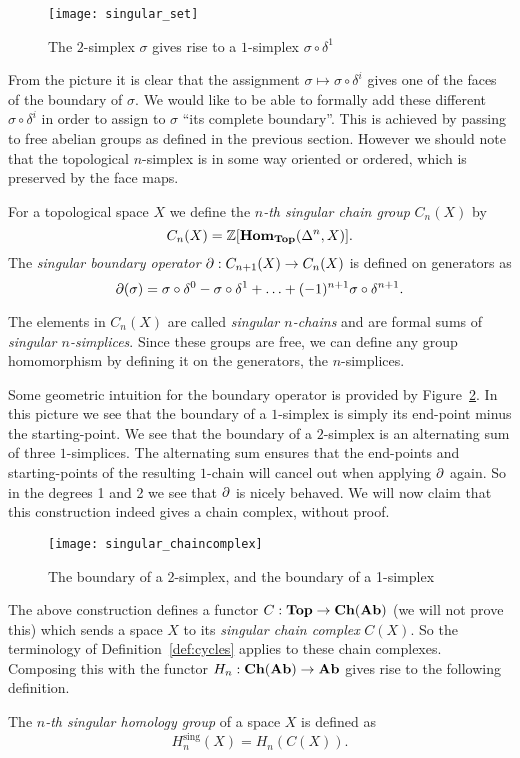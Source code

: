 \begin{figure}[h!]
	\texttt{[image: singular\_set]}
	\caption{The $2$-simplex $\sigma$ gives rise to a $1$-simplex $\sigma \circ \delta^1$}
	\label{fig:diagram_d}
\end{figure}

From the picture it is clear that the assignment $\sigma \mapsto \sigma \circ \delta^i$ gives one of the faces of the boundary of $\sigma$. We would like to be able to formally add these different $\sigma \circ \delta^i$ in order to assign to $\sigma$ ``its complete boundary''. This is achieved by passing to free abelian groups as defined in the previous section. However we should note that the topological $n$-simplex is in some way oriented or ordered, which is preserved by the face maps.

\begin{definition}
	For a topological space $X$ we define the \emph{$n$-th singular chain group} $C_n(X)$ by
	$$ C_n(X) = \mathbb{Z}[\mathbf{Hom}_{\mathbf{Top}}(\Delta^n, X)]. $$
	The \emph{singular boundary operator} $\partial : C_{n+1}(X) \to C_n(X)$ is defined on generators as
	$$ \partial(\sigma) = \sigma \circ \delta^0 - \sigma \circ \delta^1 + \ldots + (-1)^{n+1} \sigma \circ \delta^{n+1}.$$
\end{definition}

The elements in $C_n(X)$ are called \emph{singular $n$-chains} and are formal sums of \emph{singular $n$-simplices}. Since these groups are free, we can define any group homomorphism by defining it on the generators, the $n$-simplices.

Some geometric intuition for the boundary operator is provided by Figure~\ref{fig:singular_chaincomplex}. In this picture we see that the boundary of a $1$-simplex is simply its end-point minus the starting-point. We see that the boundary of a $2$-simplex is an alternating sum of three $1$-simplices. The alternating sum ensures that the end-points and starting-points of the resulting $1$-chain will cancel out when applying $\partial$ again. So in the degrees 1 and 2 we see that $\partial$ is nicely behaved. We will now claim that this construction indeed gives a chain complex, without proof.
\begin{figure}[h!]
	\texttt{[image: singular\_chaincomplex]}
	\caption{The boundary of a 2-simplex, and the boundary of a 1-simplex}
	\label{fig:singular_chaincomplex}
\end{figure}

The above construction defines a functor $C: \mathbf{Top} \to \mathbf{Ch}(\mathbf{Ab})$ (we will not prove this) which sends a space $X$ to its \emph{singular chain complex} $C(X)$. So the terminology of Definition~\ref{def:cycles} applies to these chain complexes. Composing this with the functor $H_n: \mathbf{Ch}(\mathbf{Ab}) \to \mathbf{Ab}$ gives rise to the following definition.
\begin{definition}
	The \emph{$n$-th singular homology group} of a space $X$ is defined as
	$$ H^\text{sing}_n(X) = H_n(C(X)). $$
\end{definition}

